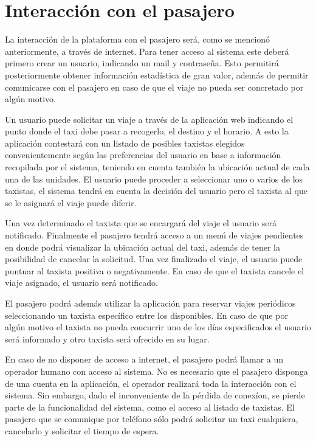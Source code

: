 \section{Interacción con el pasajero}
La interacción de la plataforma con el pasajero será, como se mencionó anteriormente, a través de internet. Para tener acceso al sistema este deberá primero crear un usuario, indicando un mail y contraseña. Esto permitirá posteriormente obtener información estadística de gran valor, además de permitir comunicarse con el pasajero en caso de que el viaje no pueda ser concretado por algún motivo. 

Un usuario puede solicitar un viaje a través de la aplicación web indicando el punto donde el taxi debe pasar a recogerlo, el destino y el horario. A esto la aplicación contestará con un listado de posibles taxistas elegidos convenientemente según las preferencias del usuario en base a información recopilada por el sistema, teniendo en cuenta también la ubicación actual de cada una de las unidades. El usuario puede proceder a seleccionar uno o varios de los taxistas, el sistema tendrá en cuenta la decisión del usuario pero el taxista al que se le asignará el viaje puede diferir.

Una vez determinado el taxista que se encargará del viaje el usuario será notificado. Finalmente el pasajero tendrá acceso a un menú de viajes pendientes en donde podrá visualizar la ubicación actual del taxi, además de tener la posibilidad de cancelar la solicitud. Una vez finalizado el viaje, el usuario puede puntuar al taxista positiva o negativamente. En caso de que el taxista cancele el viaje asignado, el usuario será notificado.

El pasajero podrá además utilizar la aplicación para reservar viajes periódicos seleccionando un taxista específico entre los disponibles. En caso de que por algún motivo el taxista no pueda concurrir uno de los días especificados el usuario será informado y otro taxista será ofrecido en su lugar.

En caso de no disponer de acceso a internet, el pasajero podrá llamar a un operador humano con acceso al sistema. No es necesario que el pasajero disponga de una cuenta en la aplicación, el operador realizará toda la interacción con el sistema. Sin embargo, dado el inconveniente de la p\'erdida de conex\'ion, se pierde parte de la funcionalidad del sistema, como el acceso al listado de taxistas. El pasajero que se comunique por tel\'efono s\'olo podr\'a solicitar un taxi cualquiera, cancelarlo y solicitar el tiempo de espera.

